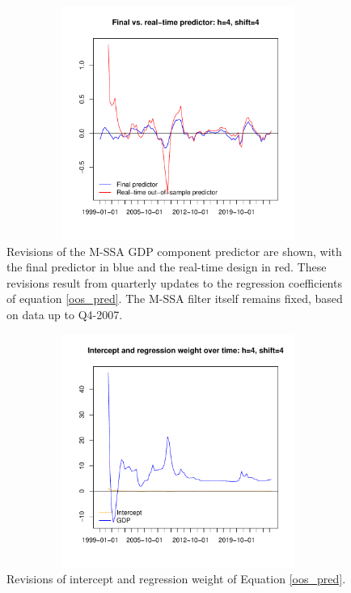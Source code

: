 \documentclass[11pt,a4paper]{article}
\begin{document}
\begin{figure}[h]
    \begin{center}
        \includegraphics[height=3in, width=4.5in]{./Figures/revisions1.pdf}
        \caption{Revisions of the M-SSA GDP component predictor are shown, with the final predictor in blue and the real-time design in red. These revisions result from quarterly updates to the regression coefficients of equation \eqref{oos_pred}. The M-SSA filter    itself remains fixed, based on data up to Q4-2007.
        \label{revisions1}}
    \end{center}
    \end{figure}

\begin{figure}[h!]
    \begin{center}
        \includegraphics[height=3in, width=4.5in]{./Figures/revisions2.pdf}
        \caption{Revisions of intercept and regression weight of Equation \eqref{oos_pred}.
        \label{revisions2}}
    \end{center}
\end{figure}
\end{document}
